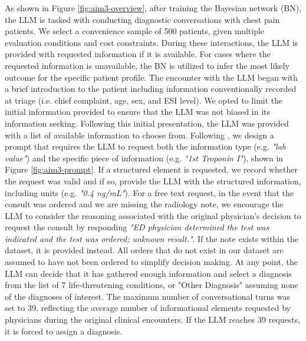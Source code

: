 As shown in Figure \ref{fig:aim3-overview}, after training the Bayesian network (BN), the LLM is tasked with conducting diagnostic conversations with chest pain patients. We select a convenience sample of 500 patients, given multiple evaluation conditions and cost constraints. During these interactions, the LLM is provided with requested information if it is available. For cases where the requested information is unavailable, the BN is utilized to infer the most likely outcome for the specific patient profile. The encounter with the LLM began with a brief introduction to the patient including information conventionally recorded at triage (i.e. chief complaint, age, sex, and ESI level). We opted to limit the initial information provided to ensure that the LLM was not biased in its information seeking. Following this initial presentation, the LLM was provided with a list of available information to choose from. Following \citet{hagerEvaluationMitigationLimitations2024}, we design a prompt that requires the LLM to request both the information type (e.g. \emph{"lab value"}) and the specific piece of information (e.g. \emph{"1st Troponin I"}), shown in Figure \ref{fig:aim3-prompt}. If a structured element is requested, we record whether the request was valid and if so, provide the LLM with the structured information, including units (e.g. \emph{"0.4 ng/mL"}). For a free text request, in the event that the consult was ordered and we are missing the radiology note, we encourage the LLM to consider the reasoning associated with the original physician's decision to request the consult by responding \emph{"ED physician determined the test was indicated and the test was ordered; unknown result."}. If the note exists within the dataset, it is provided instead. All orders that do not exist in our dataset are assumed to have not been ordered to simplify decision making. At any point, the LLM can decide that it has gathered enough information and select a diagnosis from the list of 7 life-threatening conditions, or "Other Diagnosis" assuming none of the diagnoses of interest. The maximum number of conversational turns was set to 39, reflecting the average number of informational elements requested by physicians during the original clinical encounters. If the LLM reaches 39 requests, it is forced to assign a diagnosis.

